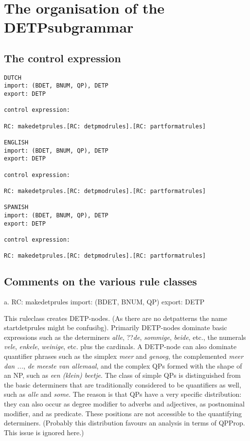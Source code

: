 \section{The organisation of the DETPsubgrammar}
\subsection{The control expression}

\begin{verbatim}
DUTCH
import: (BDET, BNUM, QP), DETP
export: DETP

control expression:

RC: makedetprules.[RC: detpmodrules].[RC: partformatrules]

ENGLISH
import: (BDET, BNUM, QP), DETP
export: DETP

control expression:

RC: makedetprules.[RC: detpmodrules].[RC: partformatrules]

SPANISH
import: (BDET, BNUM, QP), DETP
export: DETP

control expression:

RC: makedetprules.[RC: detpmodrules].[RC: partformatrules]
\end{verbatim}

\subsection{Comments on the various rule classes }

a. RC: makedetprules
import: (BDET, BNUM, QP)
export: DETP 

This ruleclass creates DETP-nodes. (As there are no detpatterns the
name startdetprules might be confusibg). Primarily DETP-nodes 
dominate basic expressions
such as the determiners {\em alle}, ??{\em de}, {\em sommige}, {\em beide}, 
etc., the numerals
{\em vele}, 
{\em enkele}, {\em weinige}, etc. plus the cardinals. A DETP-node can also
dominate quantifier phrases such as the simplex {\em meer} and {\em genoeg}, 
the
complemented 
{\em meer dan ...}, {\em de meeste van allemaal}, and the complex QPs
formed with the shape of an NP, such as {\em een (klein) beetje}. The class of
simple QPs is distinguished from the basic determiners that are traditionally
considered 
to be quantifiers as well, such as {\em alle} and {\em some}. The reason is
that QPs have a very specific distribution: they can also occur as degree
modifier to adverbs and adjectives, as postnominal modifier, and as predicate.
These positions are not accessible to the quantifying determiners. (Probably
this distribution favours an analysis in terms of QPProp. This issue is ignored
here.)\\ \\

